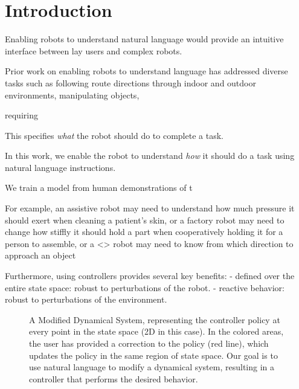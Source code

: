 \section{Introduction}
\label{secIntroduction}



Enabling robots to understand natural language would provide an intuitive interface between lay users and complex robots.

Prior work on enabling robots to understand language has addressed diverse tasks such as following route directions through indoor and outdoor environments, manipulating objects,



requiring

This specifies \emph{what} the robot should do to complete a task.




In this work, we enable the robot to understand \emph{how} it should do a task using natural language instructions.


We train a model from human demonstrations of t


For example, an assistive robot may need to understand how much pressure it should exert when cleaning a patient's skin,
or a factory robot may need to change how stiffly it should hold a part when cooperatively holding it for a person to assemble,
or a <> robot may need to know from which direction to approach an object



Furthermore, using controllers provides several key benefits:
 - defined over the entire state space: robust to perturbations of the robot.
 - reactive behavior: robust to perturbations of the environment.

\begin{figure}[h]
  \centering
  \caption{A Modified Dynamical System, representing the controller policy at every point in the state space (2D in this case). In the colored areas, the user has provided a correction to the policy (red line), which updates the policy in the same region of state space.
    Our goal is to use natural language to modify a dynamical system, resulting in a controller that performs the desired behavior.
}
  \label{figProblemSetup}
\end{figure}
